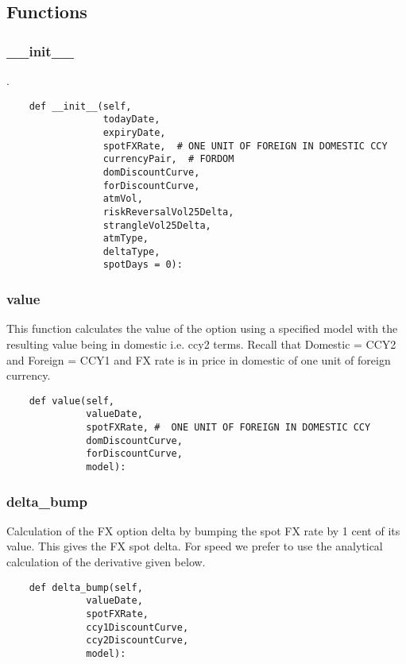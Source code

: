 \documentclass[twoside,11pt]{book}
\begin{document}
\subsection*{Functions}

\subsubsection*{{\bf \_\_init\_\_}}
.  

\begin{lstlisting}
    def __init__(self,
                 todayDate,
                 expiryDate,
                 spotFXRate,  # ONE UNIT OF FOREIGN IN DOMESTIC CCY
                 currencyPair,  # FORDOM
                 domDiscountCurve,
                 forDiscountCurve,
                 atmVol,
                 riskReversalVol25Delta,
                 strangleVol25Delta,
                 atmType,
                 deltaType,
                 spotDays = 0):
\end{lstlisting}

\subsubsection*{{\bf value}}
This function calculates the value of the option using a specified model with the resulting value being in domestic i.e. ccy2 terms. Recall that Domestic = CCY2 and Foreign = CCY1 and FX rate is in price in domestic of one unit of foreign currency.  

\begin{lstlisting}
    def value(self,
              valueDate,
              spotFXRate, #  ONE UNIT OF FOREIGN IN DOMESTIC CCY
              domDiscountCurve,
              forDiscountCurve,
              model):
\end{lstlisting}

\subsubsection*{{\bf delta\_bump}}
Calculation of the FX option delta by bumping the spot FX rate by 1 cent of its value. This gives the FX spot delta. For speed we prefer to use the analytical calculation of the derivative given below.  

\begin{lstlisting}
    def delta_bump(self,
              valueDate,
              spotFXRate,
              ccy1DiscountCurve,
              ccy2DiscountCurve,
              model):
\end{lstlisting}
\end{document}
